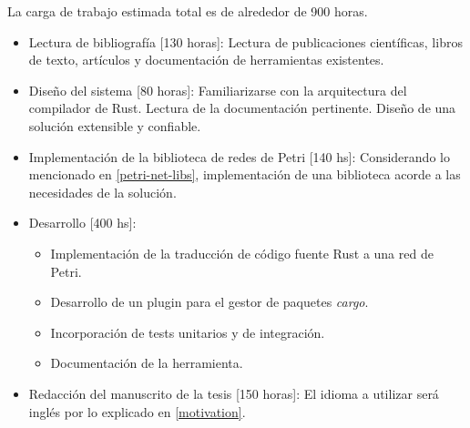 \documentclass[12pt]{article}
\begin{document}
La carga de trabajo estimada total es de alrededor de 900 horas.

\begin{itemize}
    \item Lectura de bibliografía [130 horas]: Lectura de publicaciones científicas, libros de texto, artículos y documentación de herramientas existentes.
    \item Diseño del sistema [80 horas]: Familiarizarse con la arquitectura del compilador de Rust. Lectura de la documentación pertinente. Diseño de una solución extensible y confiable.
    \item Implementación de la biblioteca de redes de Petri [140 hs]: Considerando lo mencionado en \ref{petri-net-libs}, implementación de una biblioteca acorde a las necesidades de la solución.
    \item Desarrollo [400 hs]:
          \begin{itemize}
              \item Implementación de la traducción de código fuente Rust a una red de Petri.
              \item Desarrollo de un plugin para el gestor de paquetes \textit{cargo}.
              \item Incorporación de tests unitarios y de integración.
              \item Documentación de la herramienta.
          \end{itemize}
    \item Redacción del manuscrito de la tesis [150 horas]: El idioma a utilizar será inglés por lo explicado en \ref{motivation}.
\end{itemize}

\bigskip



\end{document}

